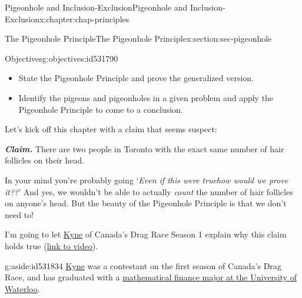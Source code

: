 \documentclass[oneside,10pt,]{book}
\newcommand{\alert}[1]{\textbf{\textit{#1}}}
\numberwithin{equation}{section}
\newlength{\qrsize}
\newlength{\previewwidth}
\begin{document}
%
%
\typeout{************************************************}
\typeout{************************************************}
%
\begin{chapterptx}{Pigeonhole and Inclusion-Exclusion}{}{Pigeonhole and Inclusion-Exclusion}{}{}{x:chapter:chap-principles}
%
%
\typeout{************************************************}
\typeout{************************************************}
%
\begin{sectionptx}{The Pigeonhole Principle}{}{The Pigeonhole Principle}{}{}{x:section:sec-pigeonhole}
\begin{objectives}{Objectives}{g:objectives:id531790}
%
\begin{itemize}[label=\textbullet]
\item{}State the Pigeonhole Principle and prove the generalized version.%
\item{}Identify the pigeons and pigeonholes in a given problem and apply the Pigeonhole Principle to come to a conclusion.%
\end{itemize}
\end{objectives}
Let's kick off this chapter with a claim that seems suspect:%
\par
\alert{Claim.} There are two people in Toronto with the exact same number of hair follicles on their head.%
\par
In your mind you're probably going `\emph{Even if this were true\textellipsis{}how would we prove it??}' And yes, we wouldn't be able to actually \emph{count} the number of hair follicles on anyone's head. But the beauty of the Pigeonhole Principle is that we don't need to!%
\par
I'm going to let \href{https://twitter.com/onlinekyne}{Kyne} of Canada's Drag Race Season 1 explain why this claim holds true (\href{https://www.tiktok.com/@onlinekyne/video/6825323353256070406}{link to video}).%
\begin{aside}{}{g:aside:id531834}%
\href{https://www.onlinekyne.com/}{Kyne} was a contestant on the first season of Canada's Drag Race, and has graduated with a \href{https://uwaterloo.ca/stories/mathematics/university-waterloos-math-student-vying-become-canadas-first}{mathematical finance major at the University of Waterloo}.%
\end{aside}
\begin{sidebyside}{1}{0.1}{0.1}{0}%
\begin{sbspanel}{0.8}%
\setlength{\qrsize}{7.2em}
\setlength{\previewwidth}{\linewidth}

\end{sbspanel}
\end{sidebyside}
\end{sectionptx}
\end{chapterptx}
\end{document}
